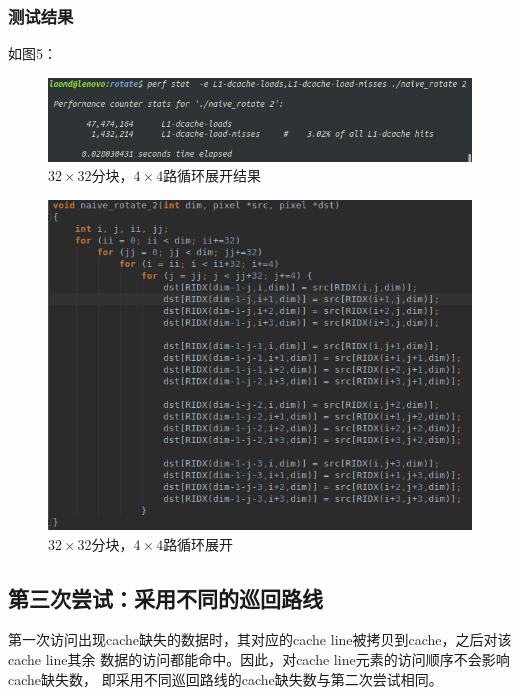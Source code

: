 \documentclass[12pt]{article}
\begin{document}
\subsubsection{测试结果}
如图5：
\begin{figure}[h]
\begin{center}
\includegraphics[width=\textwidth]{p2.png} %
\caption{$32 \times 32$分块，$4 \times 4$路循环展开结果}
\end{center}
\end{figure}

\begin{figure}[h]
\begin{center}
\includegraphics[width=\textwidth]{c2.png} %
\caption{$32 \times 32$分块，$4 \times 4$路循环展开}
\end{center}
\end{figure}

\newpage
\subsection{第三次尝试：采用不同的巡回路线}
第一次访问出现cache缺失的数据时，其对应的cache line被拷贝到cache，之后对该cache line其余
数据的访问都能命中。因此，对cache line元素的访问顺序不会影响cache缺失数，
即采用不同巡回路线的cache缺失数与第二次尝试相同。
\end{document}
